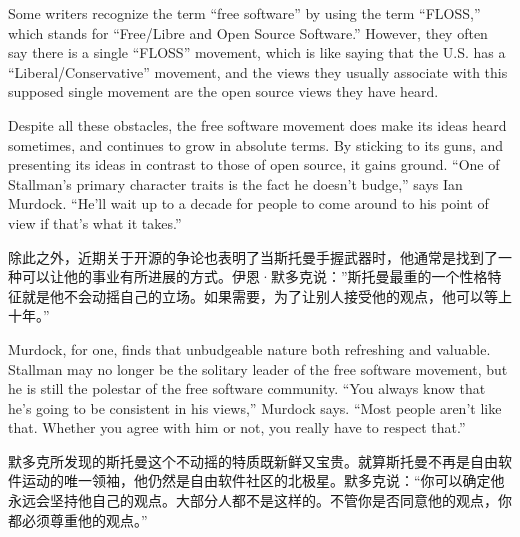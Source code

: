 \ifdefined\eng
Some writers recognize the term ``free software'' by using the term ``FLOSS,'' which stands for ``Free/Libre and Open Source Software.''  However, they often say there is a single ``FLOSS'' movement, which is like saying that the U.S. has a ``Liberal/Conservative'' movement, and the views they usually associate with this supposed single movement are the open source views they have heard.
\fi

\ifdefined\chs

\fi

\ifdefined\eng
Despite all these obstacles, the free software movement does make its ideas heard sometimes, and continues to grow in absolute terms.  By sticking to its guns, and presenting its ideas in contrast to those of open source, it gains ground. ``One of Stallman's primary character traits is the fact he doesn't budge,'' says Ian Murdock. ``He'll wait up to a decade for people to come around to his point of view if that's what it takes.''
\fi

\ifdefined\chs
除此之外，近期关于开源的争论也表明了当斯托曼手握武器时，他通常是找到了一种可以让他的事业有所进展的方式。伊恩·默多克说：”斯托曼最重的一个性格特征就是他不会动摇自己的立场。如果需要，为了让别人接受他的观点，他可以等上十年。”
\fi

\ifdefined\eng
Murdock, for one, finds that unbudgeable nature both refreshing and valuable. Stallman may no longer be the solitary leader of the free software movement, but he is still the polestar of the free software community. ``You always know that he's going to be consistent in his views,'' Murdock says. ``Most people aren't like that. Whether you agree with him or not, you really have to respect that.''
\fi

\ifdefined\chs
默多克所发现的斯托曼这个不动摇的特质既新鲜又宝贵。就算斯托曼不再是自由软件运动的唯一领袖，他仍然是自由软件社区的北极星。默多克说：“你可以确定他永远会坚持他自己的观点。大部分人都不是这样的。不管你是否同意他的观点，你都必须尊重他的观点。”
\fi

\theendnotes
\setcounter{endnote}{0}
